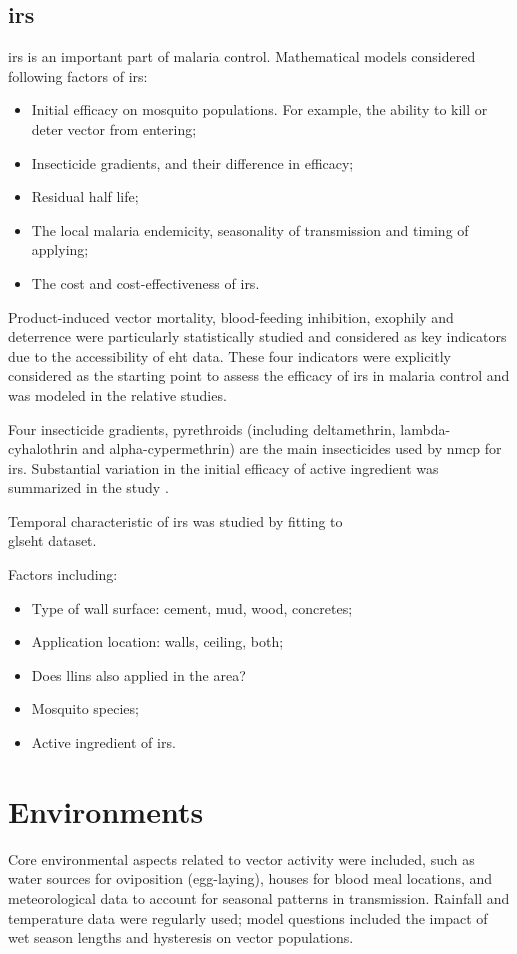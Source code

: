 \documentclass[a4paper, 12pt, twoside]{article}
\begin{document}
\subsection{\texorpdfstring{\gls{irs}}{IRS}}
\gls{irs} is an important part of malaria control.
Mathematical models considered following factors of \gls{irs}:

\begin{itemize}
  \item Initial efficacy on mosquito populations. For example, the ability to kill or deter vector from entering;
  \item Insecticide gradients, and their difference in efficacy;
  \item Residual half life;
  \item The local malaria endemicity, seasonality of transmission and timing of applying;
  \item The cost and cost-effectiveness of \gls{irs}.
\end{itemize}

Product-induced vector mortality, blood-feeding inhibition, exophily and deterrence were particularly statistically studied and considered as key indicators due to the accessibility of \gls{eht} data.
These four indicators were explicitly considered as the starting point to assess the efficacy of \gls{irs} in malaria control and was modeled in the relative studies.

Four insecticide gradients, pyrethroids (including deltamethrin, lambda-cyhalothrin and alpha-cypermethrin) are the main insecticides used by \gls{nmcp} for \gls{irs}.
Substantial variation in the initial efficacy of active ingredient was summarized in the study \cite{Sherrard-Smith2018b}.

Temporal characteristic of \gls{irs} was studied by fitting to \\gls{eht} dataset.

Factors including:
\begin{itemize}
  \item Type of wall surface: cement, mud, wood, concretes;
  \item Application location: walls, ceiling, both;
  \item Does \gls{llins} also applied in the area?
  \item Mosquito species;
  \item Active ingredient of \gls{irs}.
\end{itemize}

\section{Environments}%
\label{sec:environments}
Core environmental aspects related to vector activity were included, such as water sources for oviposition (egg-laying)\cite{Bomblies2008}, houses for blood meal locations\cite{Gu2009a}, and meteorological data to account for seasonal patterns in transmission\cite{Depinay2004}.
Rainfall and temperature data were regularly used; model questions included the impact of wet season lengths\cite{Endo2016a} and hysteresis\cite{Yamana2017} on vector populations.
\end{document}
